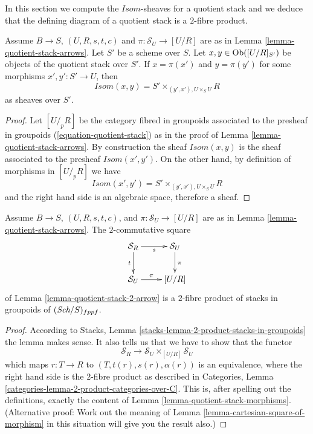 \noindent
In this section we compute the $\mathit{Isom}$-sheaves for a quotient stack
and we deduce that the defining diagram of a quotient stack is a
$2$-fibre product.

\begin{lemma}
\label{lemma-quotient-stack-morphisms}
Assume $B \to S$, $(U, R, s, t, c)$ and $\pi : \mathcal{S}_U \to [U/R]$
are as in
Lemma \ref{lemma-quotient-stack-arrows}.
Let $S'$ be a scheme over $S$.
Let $x, y \in \mathop{\rm Ob}\nolimits([U/R]_{S'})$ be objects of the
quotient stack over $S'$. If $x = \pi(x')$ and $y = \pi(y')$ for
some morphisms $x', y' : S' \to U$, then
$$
\mathit{Isom}(x, y) = S' \times_{(y', x'), U \times_S U} R
$$
as sheaves over $S'$.
\end{lemma}

\begin{proof}
Let $[U/_{\!p}R]$ be the category fibred in groupoids associated to
the presheaf in groupoids (\ref{equation-quotient-stack}) as in the proof of
Lemma \ref{lemma-quotient-stack-arrows}.
By construction the sheaf $\mathit{Isom}(x, y)$ is the sheaf associated
to the presheaf $\mathit{Isom}(x', y')$. On the other hand, by definition
of morphisms in $[U/_{\!p}R]$ we have
$$
\mathit{Isom}(x', y') = S' \times_{(y', x'), U \times_S U} R
$$
and the right hand side is an algebraic space, therefore a sheaf.
\end{proof}

\begin{lemma}
\label{lemma-quotient-stack-2-cartesian}
Assume $B \to S$, $(U, R, s, t, c)$, and $\pi : \mathcal{S}_U \to [U/R]$
are as in
Lemma \ref{lemma-quotient-stack-arrows}.
The $2$-commutative square
$$
\xymatrix{
\mathcal{S}_R \ar[r]_s \ar[d]_t & \mathcal{S}_U \ar[d]^\pi \\
\mathcal{S}_U \ar[r]^-\pi & [U/R]
}
$$
of
Lemma \ref{lemma-quotient-stack-2-arrow}
is a $2$-fibre product of stacks in groupoids of $(\textit{Sch}/S)_{fppf}$.
\end{lemma}

\begin{proof}
According to
Stacks, Lemma \ref{stacks-lemma-2-product-stacks-in-groupoids}
the lemma makes sense. It also tells us that we have to show that
the functor
$$
\mathcal{S}_R \longrightarrow \mathcal{S}_U \times_{[U/R]} \mathcal{S}_U
$$
which maps $r : T \to R$ to $(T, t(r), s(r), \alpha(r))$ is an equivalence,
where the right hand side is the $2$-fibre product as described in
Categories, Lemma \ref{categories-lemma-2-product-categories-over-C}.
This is, after spelling out the definitions, exactly the content of
Lemma \ref{lemma-quotient-stack-morphisms}. (Alternative proof: Work out
the meaning of
Lemma \ref{lemma-cartesian-square-of-morphism}
in this situation will give you the result also.)
\end{proof}

